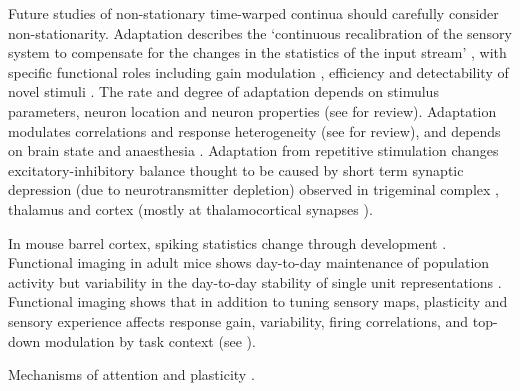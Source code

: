 \documentclass{article}
\begin{document}
Future studies of non-stationary time-warped continua should carefully consider non-stationarity. Adaptation describes the `continuous recalibration of the sensory system to compensate for the changes in the statistics of the input stream' \cite{kheradpezhouh2017response}, with specific functional roles including gain modulation \cite{ahissar2000transformation, heiss2008shift, khatri2009stimulus, mohar2013opposite}, efficiency \cite{sharpee2006adaptive} and detectability of novel stimuli \cite{dragoi2002dynamics, ulanovsky2003processing}. The rate and degree of adaptation depends on stimulus parameters, neuron location and neuron properties (see \cite{kheradpezhouh2017response} for review). Adaptation modulates correlations and response heterogeneity (see \cite{kheradpezhouh2017response} for review), and depends on brain state and anaesthesia \cite{castro2004absence, katz2012trial}. Adaptation from repetitive stimulation changes excitatory-inhibitory balance \cite{higley2006balanced, heiss2008shift, malina2013imbalance} thought to be caused by short term synaptic depression (due to neurotransmitter depletion) observed in trigeminal complex \cite{mohar2013opposite}, thalamus \cite{deschenes2003relay} and cortex \cite{higley2006balanced, heiss2008shift, malina2013imbalance} (mostly at thalamocortical synapses \cite{chung2002short}).

In mouse barrel cortex, spiking statistics change through development \cite{van2017layer}. Functional imaging in adult mice shows day-to-day maintenance of population activity \cite{margolis2012reorganization, mayrhofer2015sparse} but variability in the day-to-day stability of single unit representations \cite{mayrhofer2015sparse}. Functional imaging shows that in addition to tuning sensory maps, plasticity and sensory experience affects response gain, variability, firing correlations, and top-down modulation by task context (see \cite{lemessurier2018plasticity}). 

Mechanisms of attention \cite{cohen2010neuronal} and plasticity \cite{lemessurier2018plasticity}.






\end{document}
